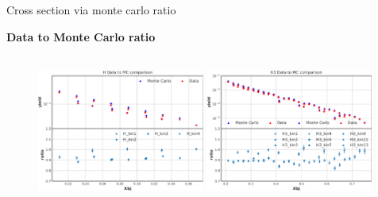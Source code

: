 \documentclass{beamer}
\begin{document}
\begin{frame}{Cross section via monte carlo ratio}
\begin{block}{\textbf{Data to Monte Carlo ratio}}
	\begin{figure}
	\hspace*{-0.5cm}\includegraphics[height=5cm,width=5.50cm]{../images/H_all.pdf}			\hspace*{0.5cm}\includegraphics[height=5cm,width=5.50cm]{../images/H3_all.pdf}
	\end{figure}
\end{block}
\end{frame}
\end{document}
